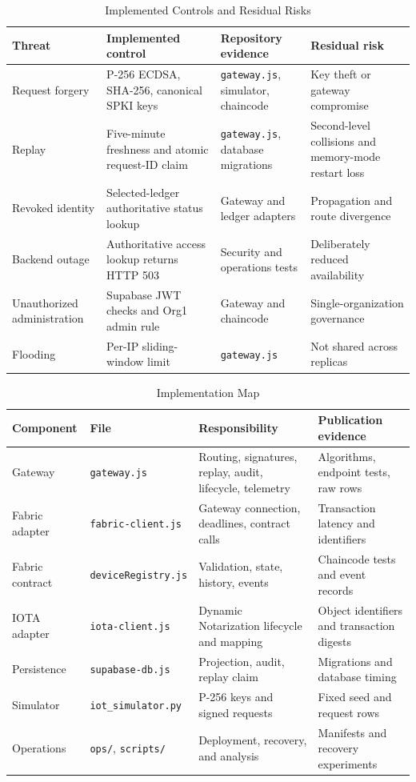\begin{table}[t]
\caption{Implemented Controls and Residual Risks}
\label{tab:controls}
\centering
\footnotesize
\begin{tabularx}{\textwidth}{@{}l X X X@{}}
\toprule
Threat & Implemented control & Repository evidence & Residual risk \\
\midrule
Request forgery & P-256 ECDSA, SHA-256, canonical SPKI keys & \texttt{gateway.js}, simulator, chaincode & Key theft or gateway compromise \\
Replay & Five-minute freshness and atomic request-ID claim & \texttt{gateway.js}, database migrations & Second-level collisions and memory-mode restart loss \\
Revoked identity & Selected-ledger authoritative status lookup & Gateway and ledger adapters & Propagation and route divergence \\
Backend outage & Authoritative access lookup returns HTTP 503 & Security and operations tests & Deliberately reduced availability \\
Unauthorized administration & Supabase JWT checks and Org1 admin rule & Gateway and chaincode & Single-organization governance \\
Flooding & Per-IP sliding-window limit & \texttt{gateway.js} & Not shared across replicas \\
\bottomrule
\end{tabularx}
\end{table}

\begin{table}[t]
\caption{Implementation Map}
\label{tab:implementation}
\centering
\footnotesize
\begin{tabularx}{\textwidth}{@{}l l X X@{}}
\toprule
Component & File & Responsibility & Publication evidence \\
\midrule
Gateway & \texttt{gateway.js} & Routing, signatures, replay, audit, lifecycle, telemetry & Algorithms, endpoint tests, raw rows \\
Fabric adapter & \texttt{fabric-client.js} & Gateway connection, deadlines, contract calls & Transaction latency and identifiers \\
Fabric contract & \texttt{deviceRegistry.js} & Validation, state, history, events & Chaincode tests and event records \\
IOTA adapter & \texttt{iota-client.js} & Dynamic Notarization lifecycle and mapping & Object identifiers and transaction digests \\
Persistence & \texttt{supabase-db.js} & Projection, audit, replay claim & Migrations and database timing \\
Simulator & \texttt{iot_simulator.py} & P-256 keys and signed requests & Fixed seed and request rows \\
Operations & \texttt{ops/}, \texttt{scripts/} & Deployment, recovery, and analysis & Manifests and recovery experiments \\
\bottomrule
\end{tabularx}
\end{table}

